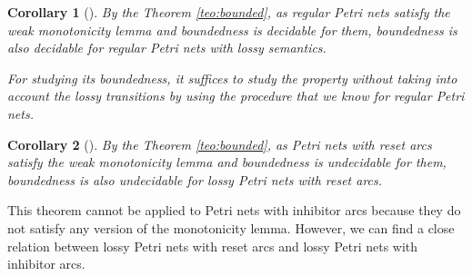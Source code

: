 \documentclass{article}
\newtheorem{corollary}{Corollary}
\begin{document}
\begin{corollary}[]\label{cor:regular-lossy-bound}
By the Theorem \ref{teo:bounded}, as regular Petri nets satisfy 
the weak monotonicity lemma and boundedness is decidable for them,
boundedness is also decidable for regular Petri nets with lossy 
semantics.

For studying its boundedness, it suffices to study the property
without taking into account the lossy transitions by using the 
procedure that we know for regular Petri nets.
\end{corollary}

\begin{corollary}[]\label{cor:reset-lossy-bound}
By the Theorem \ref{teo:bounded}, as Petri nets with reset arcs 
satisfy the weak monotonicity lemma and boundedness is undecidable 
for them, boundedness is also undecidable for lossy Petri nets 
with reset arcs.
\end{corollary}

This theorem cannot be applied to Petri nets with inhibitor arcs 
because they do not satisfy any version of the monotonicity lemma.
However, we can find a close relation between lossy Petri nets with 
reset arcs and lossy Petri nets with inhibitor arcs.
\end{document}
